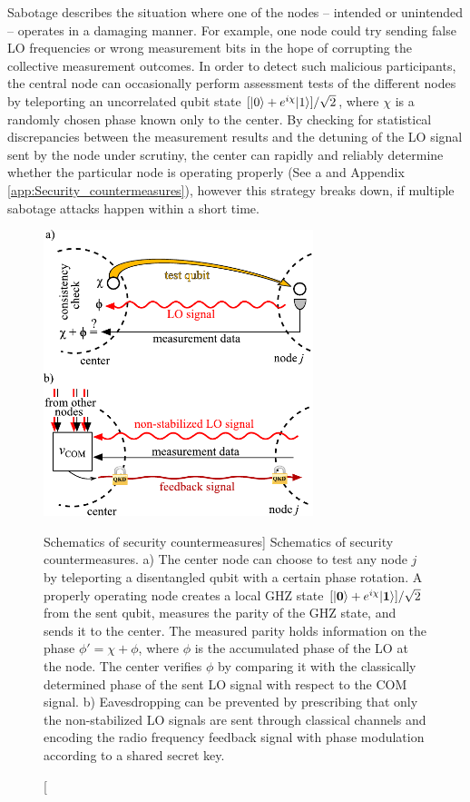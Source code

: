 Sabotage describes the situation where one of the nodes -- intended or
unintended -- operates in a damaging manner. For example, one node
could try sending false LO frequencies or wrong measurement bits in the hope of
corrupting the collective measurement outcomes. In order to detect such
malicious participants, the central node can occasionally perform assessment
tests of the different nodes by teleporting an uncorrelated qubit state
$[| 0 \rangle + e^{i\chi}| 1 \rangle]/\sqrt{2}$, where $\chi$ is a
 randomly chosen phase known only to the center. By checking for statistical
discrepancies between the measurement results and the detuning of the LO signal
sent by the node under scrutiny, the center can rapidly and reliably determine
whether the particular node is operating properly (See a
and Appendix \ref{app:Security_countermeasures}),
however this strategy breaks down, if multiple sabotage attacks
happen within a short time.
\begin{figure}
\centering
\includegraphics[width=0.7\textwidth]{./figs_Komar2014/fig4.pdf}
\caption
[Schematics of security countermeasures]
{
\label{fig:security}
Schematics of security countermeasures.
a) The center node can choose to test any node $j$ by teleporting a disentangled
qubit with a certain phase rotation. A properly operating node creates a local
GHZ state $[| \mathbf{0} \rangle + e^{i\chi}| \mathbf{1} \rangle]/\sqrt{2}$ from the
sent qubit,
 measures the parity of the GHZ state, and sends it to the center. The
measured parity holds information on the phase $\phi' = \chi + \phi$, where
$\phi$ is the accumulated phase of the LO at the node. The center verifies
$\phi$ by comparing it with the classically determined  phase of the sent LO
signal with respect to the COM signal.
b) Eavesdropping can be prevented by prescribing that only the non-stabilized LO
signals are sent through  classical channels and encoding the radio frequency
feedback signal with phase  modulation according to a shared secret key.
}
\end{figure}


